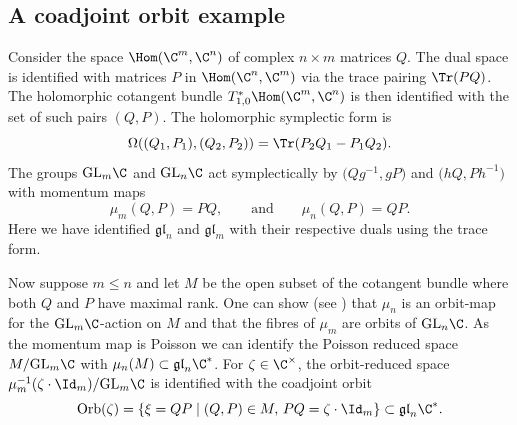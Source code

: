 \subsection{A coadjoint orbit example}\label{theexample}
Consider the space $\Hom(\C^m,\C^n)$ of complex $n\times m$ matrices $Q$. The dual space is identified with matrices $P$ in $\Hom(\C^n,\C^m)$ via the trace pairing $\Tr(PQ)$. The holomorphic cotangent bundle $T^*_{1,0}\Hom(\C^m,\C^n)$ is then identified with the set of such pairs $(Q,P)$. The holomorphic symplectic form is
\begin{equation*}%
	\Omega((Q_1,P_1),(Q_2,P_2))=\Tr(P_2Q_1-P_1Q_2).
\end{equation*}
The groups ${\rm GL}_m\C$ and ${\rm GL}_n\C$ act symplectically by $\bigl(Qg^{-1},gP\bigr)$ and $\bigl(hQ,Ph^{-1}\bigr)$ with momentum maps
\begin{equation*}	%
	\mu_m(Q,P)=PQ,\qquad\text{and}\qquad\mu_n(Q,P)=QP.
\end{equation*}
Here we have identified $\mathfrak{gl}_n$ and $\mathfrak{gl}_m$ with their respective duals using the trace form.

Now suppose $m\le n$ and let $M$ be the open subset of the cotangent bundle where both $Q$ and $P$ have maximal rank. One can show (see \cite{dualpairs}) that $\mu_n$ is an orbit-map for the ${\rm GL}_m\C$-action on $M$ and that the fibres of $\mu_m$ are orbits of ${\rm GL}_n\C$. As the momentum map is Poisson we can identify the Poisson reduced space $M/{\rm GL}_m\C$ with $\mu_n(M)\subset\mathfrak{gl}_n\C^*$. For $\zeta\in\C^\times$, the orbit-reduced space $\mu_m^{-1}(\zeta\cdot\Id_m)/{\rm GL}_m\C$ is identified with the coadjoint orbit
\begin{equation}
	\label{coad_orbit}
	{\rm Orb}(\zeta)=\{\xi=QP\mid (Q,P)\in M,\,PQ=\zeta\cdot\Id_m\}\subset\mathfrak{gl}_n\C^*.
\end{equation}

